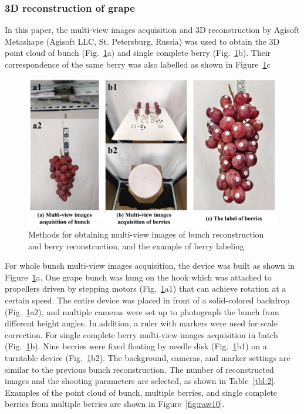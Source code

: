 \documentclass[12pt]{article}
\begin{document}
\subsubsection{3D reconstruction of grape}
\label{sec:212}

In this paper, the multi-view images acquisition and 3D reconstruction by Agisoft Metashape (Agisoft LLC, St. Petersburg, Russia) was used to obtain the 3D point cloud of bunch (Fig.~\ref{fig:raw9}a) and single complete berry (Fig.~\ref{fig:raw9}b). 
Their correspondence of the same berry was also labelled as shown in Figure~\ref{fig:raw9}c

\begin{figure}[hbt!]
    \centering
    \includegraphics[width=1\textwidth]{figures/Figure3.pdf}
    \caption{Methods for obtaining multi-view images of bunch reconstruction and berry reconstruction, and the example of berry labeling}
    \label{fig:raw9}
\end{figure}

For whole bunch multi-view images acquisition, the device was built as shown in Figure~\ref{fig:raw9}a. 
One grape bunch was hung on the hook which was attached to propellers driven by stepping motors (Fig.~\ref{fig:raw9}a1) that can achieve rotation at a certain speed. 
The entire device was placed in front of a solid-colored backdrop (Fig.~\ref{fig:raw9}a2), and multiple cameras were set up to photograph the bunch from different height angles. 
In addition, a ruler with markers were used for scale correction. 
For single complete berry multi-view images acquisition in batch (Fig.~\ref{fig:raw9}b). 
Nine berries were fixed floating by needle disk (Fig.~\ref{fig:raw9}b1) on a turntable device (Fig.~\ref{fig:raw9}b2). 
The background, cameras, and marker settings are similar to the previous bunch reconstruction. 
The number of reconstructed images and the shooting parameters are selected, as shown in Table~\ref{tbl:2}. 
Examples of the point cloud of bunch, multiple berries, and single complete berries from multiple berries are shown in Figure~\ref{fig:raw10}.
\end{document}
